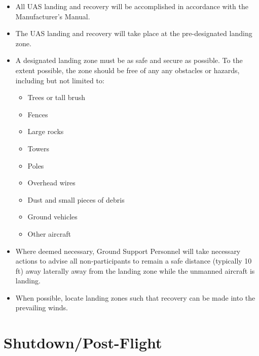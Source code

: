 \documentclass[
]{book}
\providecommand{\tightlist}{%
  \setlength{\itemsep}{0pt}\setlength{\parskip}{0pt}}
\begin{document}
\begin{itemize}
\item
  All UAS landing and recovery will be accomplished in accordance with the Manufacturer's Manual.
\item
  The UAS landing and recovery will take place at the pre-designated landing zone.
\item
  A designated landing zone must be as safe and secure as possible. To the extent possible, the zone should be free of any any obstacles or hazards, including but not limited to:

  \begin{itemize}
  \tightlist
  \item
    Trees or tall brush
  \item
    Fences
  \item
    Large rocks
  \item
    Towers
  \item
    Poles
  \item
    Overhead wires
  \item
    Dust and small pieces of debris
  \item
    Ground vehicles
  \item
    Other aircraft
  \end{itemize}
\item
  Where deemed necessary, Ground Support Personnel will take necessary actions to advise all non-participants to remain a safe distance (typically 10 ft) away laterally away from the landing zone while the unmanned aircraft is landing.
\item
  When possible, locate landing zones such that recovery can be made into the prevailing winds.
\end{itemize}

\hypertarget{shutdownpost-flight}{%
\section{Shutdown/Post-Flight}\label{shutdownpost-flight}}
\end{document}
